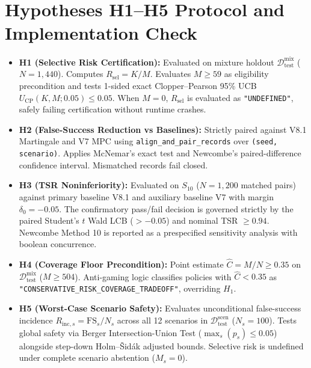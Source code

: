 \documentclass[10pt,a4paper]{article}
\begin{document}
\section{Hypotheses H1--H5 Protocol and Implementation Check}

\begin{itemize}
    \item \textbf{H1 (Selective Risk Certification):} Evaluated on mixture holdout $\mathcal{D}_{\text{test}}^{\text{mix}}$ ($N=1,440$). Computes $R_{\text{sel}} = K / M$. Evaluates $M \ge 59$ as eligibility precondition and tests 1-sided exact Clopper--Pearson 95\% UCB $U_{\text{CP}}(K, M; 0.05) \le 0.05$. When $M = 0$, $R_{\text{sel}}$ is evaluated as \texttt{"UNDEFINED"}, safely failing certification without runtime crashes.
    \item \textbf{H2 (False-Success Reduction vs Baselines):} Strictly paired against V8.1 Martingale and V7 MPC using \texttt{align\_and\_pair\_records} over \texttt{(seed, scenario)}. Applies McNemar's exact test and Newcombe's paired-difference confidence interval. Mismatched records fail closed.
    \item \textbf{H3 (TSR Noninferiority):} Evaluated on $S_{10}$ ($N=1,200$ matched pairs) against primary baseline V8.1 and auxiliary baseline V7 with margin $\delta_0 = -0.05$. The confirmatory pass/fail decision is governed strictly by the paired Student's $t$ Wald LCB ($> -0.05$) and nominal TSR $\ge 0.94$. Newcombe Method 10 is reported as a prespecified sensitivity analysis with boolean concurrence.
    \item \textbf{H4 (Coverage Floor Precondition):} Point estimate $\widehat{C} = M / N \ge 0.35$ on $\mathcal{D}_{\text{test}}^{\text{mix}}$ ($M \ge 504$). Anti-gaming logic classifies policies with $\widehat{C} < 0.35$ as \texttt{"CONSERVATIVE\_RISK\_COVERAGE\_TRADEOFF"}, overriding $H_1$.
    \item \textbf{H5 (Worst-Case Scenario Safety):} Evaluates unconditional false-success incidence $R_{\text{inc}, s} = \mathrm{FS}_s / N_s$ across all 12 scenarios in $\mathcal{D}_{\text{test}}^{\text{scen}}$ ($N_s = 100$). Tests global safety via Berger Intersection-Union Test ($\max_s(p_s) \le 0.05$) alongside step-down Holm--Šidák adjusted bounds. Selective risk is undefined under complete scenario abstention ($M_s = 0$).
\end{itemize}
\end{document}
